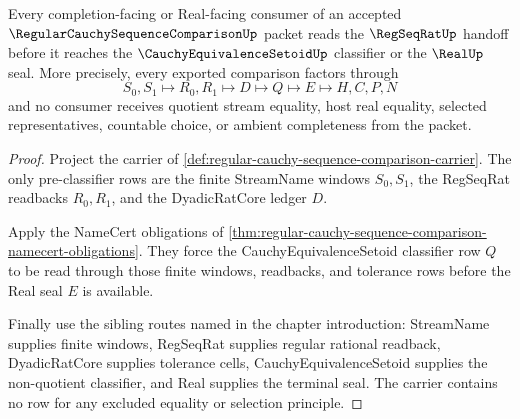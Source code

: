 \begin{theorem}
\label{thm:regular-cauchy-sequence-comparison-regseqrat-handoff}
Every completion-facing or Real-facing consumer of an accepted $\RegularCauchySequenceComparisonUp$ packet reads the $\RegSeqRatUp$ handoff before it reaches the $\CauchyEquivalenceSetoidUp$ classifier or the $\RealUp$ seal. More precisely, every exported comparison factors through
$$
S_0,S_1 \longmapsto R_0,R_1 \longmapsto D \longmapsto Q \longmapsto E \longmapsto H,C,P,N
$$
and no consumer receives quotient stream equality, host real equality, selected representatives, countable choice, or ambient completeness from the packet.
\end{theorem}
\begin{proof}
Project the carrier of \autoref{def:regular-cauchy-sequence-comparison-carrier}. The only pre-classifier rows are the finite StreamName windows $S_0,S_1$, the RegSeqRat readbacks $R_0,R_1$, and the DyadicRatCore ledger $D$.

Apply the NameCert obligations of \autoref{thm:regular-cauchy-sequence-comparison-namecert-obligations}. They force the CauchyEquivalenceSetoid classifier row $Q$ to be read through those finite windows, readbacks, and tolerance rows before the Real seal $E$ is available.

Finally use the sibling routes named in the chapter introduction: StreamName supplies finite windows, RegSeqRat supplies regular rational readback, DyadicRatCore supplies tolerance cells, CauchyEquivalenceSetoid supplies the non-quotient classifier, and Real supplies the terminal seal. The carrier contains no row for any excluded equality or selection principle.
\end{proof}

